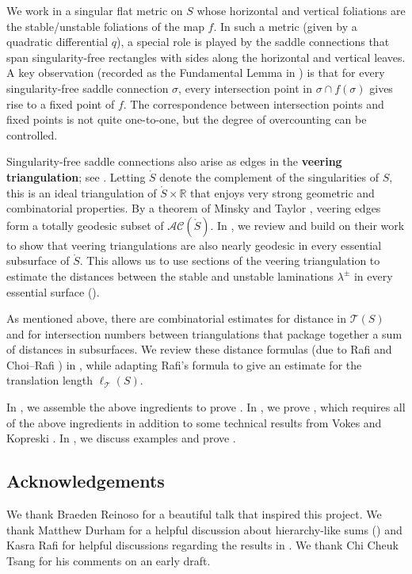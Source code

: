 \documentclass[11pt,letterpaper]{amsart}
\newcommand{\RR}[0]{\mathbb{R}}
\newcommand{\mr}{\mathring}
\newcommand{\teich}{\mathcal T}
\numberwithin{equation}{section}
\theoremstyle{definition}
\newcommand{\define}[1]{\textbf{#1}}
\newcommand{\AC}{\mathcal{AC}}
\begin{document}
We work in a singular flat metric on $S$ whose horizontal and vertical foliations are the stable/unstable foliations of the map $f$. In such a metric (given by a quadratic differential $q$), a special role is played by  the saddle connections  that span singularity-free rectangles with sides along the horizontal and vertical leaves. A key observation (recorded as the Fundamental Lemma in ) is that for every singularity-free saddle connection $\sigma$, every intersection point in $\sigma \cap f(\sigma)$ gives rise to a fixed point of $f$. The correspondence between intersection points and fixed points is not quite one-to-one, but the degree of overcounting can be controlled.

Singularity-free saddle connections also arise as edges in the \define{veering triangulation}; see . Letting $\mr S$ denote the complement of the singularities of $S$, this is an ideal triangulation of $\mr S \times \RR$ that enjoys very strong geometric and combinatorial properties. By a theorem of Minsky and Taylor \cite[Theorem 1.4]{MinskyTaylor:FiberedFaces}, veering edges form a totally geodesic subset of $\AC(\mr S)$. In , we review and build on their work \cite{MinskyTaylor:FiberedFaces,MinskyTaylor:SubsurfaceDist} to show that veering triangulations are also nearly geodesic in every essential subsurface of $\mr S$. This allows us to use sections of the veering triangulation to estimate the distances between the stable and unstable laminations $\lambda^\pm$ in every essential surface ().

As mentioned above, there are combinatorial estimates for distance in $\teich(S)$ and for intersection numbers between triangulations that package together a sum of distances in subsurfaces. We review these distance formulas (due to Rafi \cite{Rafi:Combinatorial} and Choi--Rafi \cite{choi2007comparison}) in , while adapting Rafi's formula to give an estimate for the translation length $\ell_\teich(S)$.

In , we assemble the above ingredients to prove . In , we prove , which requires all of the above ingredients in addition to some technical results from Vokes \cite{Vokes} and Kopreski \cite{Kopreski}. In , we discuss examples and prove .

 \vspace{-1ex}
\subsection*{Acknowledgements}
We thank Braeden Reinoso for a beautiful talk that inspired this project.
We thank Matthew Durham for a helpful discussion about hierarchy-like sums ()
and Kasra Rafi for helpful discussions regarding the results in .
We thank Chi Cheuk Tsang for his comments on an early draft.
\end{document}
